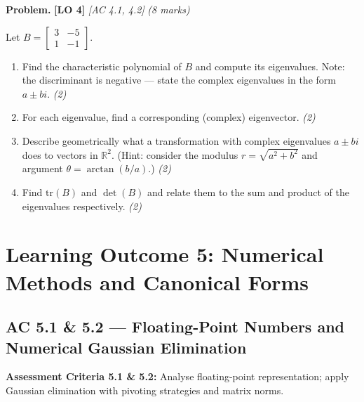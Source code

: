 \documentclass[12pt,a4paper]{article}
\newcommand{\lo}[1]{\textcolor{locolor}{\textbf{[LO #1]}}}
\newcommand{\ac}[1]{\textcolor{locolor}{\textit{[AC #1]}}}
\newcommand{\R}{\mathbb{R}}
\newcommand{\mat}[1]{\begin{bmatrix}#1\end{bmatrix}}
\begin{document}
	\begin{tcolorbox}[practice]
		\textbf{Problem.} \lo{4} \ac{4.1, 4.2} \hfill \textit{(8 marks)}
		
		Let $B=\mat{3&-5\\1&-1}$.
		\begin{enumerate}[label=(\alph*)]
			\item Find the characteristic polynomial of $B$ and compute its eigenvalues. Note: the discriminant is negative — state the complex eigenvalues in the form $a\pm bi$. \hfill\textit{(2)}
			\item For each eigenvalue, find a corresponding (complex) eigenvector. \hfill\textit{(2)}
			\item Describe geometrically what a transformation with complex eigenvalues $a\pm bi$ does to vectors in $\R^2$. (Hint: consider the modulus $r=\sqrt{a^2+b^2}$ and argument $\theta=\arctan(b/a)$.) \hfill\textit{(2)}
			\item Find $\text{tr}(B)$ and $\det(B)$ and relate them to the sum and product of the eigenvalues respectively. \hfill\textit{(2)}
		\end{enumerate}
	\end{tcolorbox}
	
	\begin{tcolorbox}[answer]
	\end{tcolorbox}
	
	\newpage
	
	\section{Learning Outcome 5: Numerical Methods and Canonical Forms}
	
	\subsection{AC 5.1 \& 5.2 — Floating-Point Numbers and Numerical Gaussian Elimination}
	
	\begin{tcolorbox}[subtopic]
		\textbf{Assessment Criteria 5.1 \& 5.2:} Analyse floating-point representation; apply
		Gaussian elimination with pivoting strategies and matrix norms.
	\end{tcolorbox}
	
\end{document}
